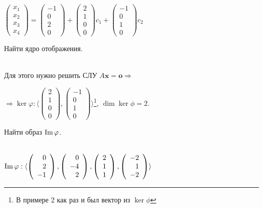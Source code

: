 $\left( \begin{array}{r}
x_1\\
x_2\\
x_3\\
x_4
\end{array}\right) = \left( \begin{array}{r}
-1\\
0\\
2\\
0
\end{array}\right) + \left( \begin{array}{r}
2\\
1\\
0\\
0
\end{array}\right) c_1 + \left( \begin{array}{r}
-1\\
0\\
1\\
0
\end{array}\right) c_2 $

\begin{prim}
	Найти ядро отображения.
\end{prim}\\

Для этого нужно решить СЛУ $A\textbf{x}=\textbf{o} \Rightarrow$

$\Rightarrow\ker\varphi:\langle \left( \begin{array}{r} %
2\\
1\\
0\\
0
\end{array}\right), \left( \begin{array}{r}
-1\\
0\\
1\\
0
\end{array}\right)\rangle$\footnote{В примере 2 как раз и был вектор из $\ker\phi$}, \quad $\dim\ker\phi=2$.

\begin{prim}
	Найти образ $\operatorname{\mathop{Im}}\varphi$.
\end{prim}\\

$\operatorname{\mathop{Im}}\varphi : \langle \left( \begin{array}{r}
0\\
2\\
-1
\end{array}\right),\left( \begin{array}{r}
0\\
-4\\
2
\end{array}\right),\left( \begin{array}{r}
2\\
1\\
1
\end{array}\right),\left( \begin{array}{r}
-2\\
1\\
-2
\end{array}\right) \rangle$

